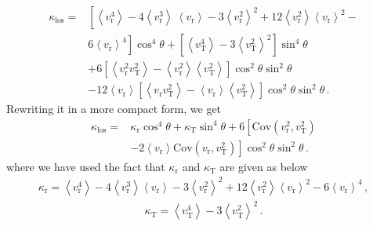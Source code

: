 \documentclass[a4paper,fleqn,usenatbib]{mnras}
\begin{document}
	\begin{eqnarray}
		\kappa_{\mathrm{los}} =& \left[ \left\langle v^4_{\mathrm{r}}\right\rangle - 4\left\langle v^3_{\mathrm{r}}\right\rangle\ \left\langle v_{\mathrm{r}}\right\rangle - 3\left\langle v^2_{\mathrm{r}}\right\rangle^2 + 12\left\langle v^2_{\mathrm{r}}\right\rangle\left\langle v_{\mathrm{r}}\right\rangle^2 - \right.\nonumber\\
		&\left. 6\left\langle v_{\mathrm{r}}\right\rangle^4\right]\cos^4\theta + \left[\left\langle v^4_{\mathrm{T}} \right\rangle -3\left\langle v^2_{\mathrm{T}} \right\rangle^2\right]\sin^4\theta  \nonumber \\
		& + 6\left[\left\langle  v^2_{\mathrm{r}}v^2_{\mathrm{T}}\right\rangle - \left\langle  v^2_{\mathrm{r}}\right\rangle \left\langle v^2_{\mathrm{T}}\right\rangle\right]\cos^2\theta\sin^2\theta \nonumber\\
		& -12 \left\langle v_{\mathrm{r}}\right\rangle \left[\left\langle  v_{\mathrm{r}}v^2_{\mathrm{T}}\right\rangle - \left\langle  v_{\mathrm{r}}\right\rangle \left\langle v^2_{\mathrm{T}}\right\rangle\right]\cos^2\theta\sin^2\theta \,.
	\end{eqnarray}
	Rewriting it in a more compact form, we get
	\begin{eqnarray}\label{eq:c44}
		\kappa_{\mathrm{los}} = &\kappa_{\mathrm{r}}\cos^4\theta + \kappa_{\mathrm{T}}\sin^4\theta + 6\left[\mathrm{Cov}\left(v^2_{\mathrm{r}},v^2_{\mathrm{T}}\right) \right.\nonumber \\
		& \left. - 2\left\langle v_{\mathrm{r}}\right\rangle \mathrm{Cov}\left(v_{\mathrm{r}},v^2_{\mathrm{T}}\right)\right]\cos^2\theta\sin^2\theta \,.
	\end{eqnarray}
	\noindent where we have used the fact that $\kappa_{\mathrm{r}}$ and $\kappa_{\mathrm{T}}$ are given as below
	\begin{eqnarray}
		\kappa_{\mathrm{r}} =  \left\langle v^4_{\mathrm{r}}\right\rangle - 4\left\langle v^3_{\mathrm{r}}\right\rangle \left\langle v_{\mathrm{r}}\right\rangle - 3\left\langle v^2_{\mathrm{r}}\right\rangle^2 + 12\left\langle v^2_{\mathrm{r}}\right\rangle \left\langle v_{\mathrm{r}}\right\rangle^2 - 6\left\langle v_{\mathrm{r}}\right\rangle^4 \, ,
	\end{eqnarray}
	\begin{eqnarray}
		\kappa_{\mathrm{T}} = \left\langle v^4_{\mathrm{T}} \right\rangle -3\left\langle v^2_{\mathrm{T}} \right\rangle^2 \, .
	\end{eqnarray}
\end{document}
